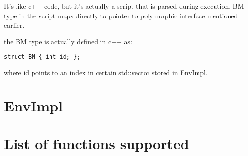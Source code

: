 \documentclass[11pt,twoside,a4paper]{article}
\begin{document}
It's like c++ code, but it's actually a script that is parsed during execution.
BM type in the script maps directly to 
pointer to polymorphic interface mentioned earlier.

the BM type is actually defined in c++ as:
\begin{verbatim}
struct BM { int id; };
\end{verbatim}
where id points to an index in certain std::vector stored in EnvImpl.

\section{EnvImpl}

\section{List of functions supported}
\end{document}
